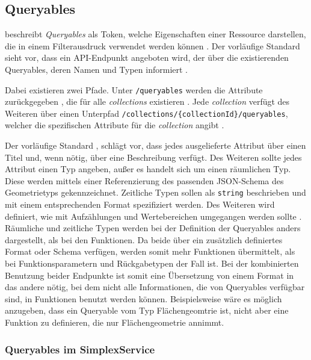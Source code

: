 \subsection{Queryables}
\label{sec:queryables}

 beschreibt \textit{Queryables} als Token, welche Eigenschaften einer Ressource darstellen, die in einem Filterausdruck verwendet werden können . Der vorläufige Standard sieht vor, dass ein \ac{API}-Endpunkt angeboten wird, der über die existierenden Queryables, deren Namen und Typen informiert .

Dabei existieren zwei Pfade. Unter \texttt{/queryables} werden die Attribute zurückgegeben , die für alle \textit{collections} existieren . Jede \textit{collection} verfügt des Weiteren über einen Unterpfad \texttt{/collections/\{collectionId\}/queryables}, welcher die spezifischen Attribute für die \textit{collection} angibt .

Der vorläufige Standard , schlägt vor, dass jedes ausgelieferte Attribut über einen Titel und, wenn nötig, über eine Beschreibung verfügt. Des Weiteren sollte jedes Attribut einen Typ angeben, außer es handelt sich um einen räumlichen Typ. Diese werden mittels einer Referenzierung des passenden \ac{JSON}-Schema des Geometrietyps gekennzeichnet. Zeitliche Typen sollen als \texttt{string} beschrieben und mit einem entsprechenden Format spezifiziert werden. Des Weiteren wird definiert, wie mit Aufzählungen und Wertebereichen umgegangen werden sollte . Räumliche und zeitliche Typen werden bei der Definition der Queryables anders dargestellt, als bei den Funktionen. Da beide über ein zusätzlich definiertes Format oder Schema verfügen, werden somit mehr Funktionen übermittelt, als bei Funktionsparametern und Rückgabetypen der Fall ist. Bei der kombinierten Benutzung beider Endpunkte ist somit eine Übersetzung von einem Format in das andere nötig, bei dem nicht alle Informationen, die von Queryables verfügbar sind, in Funktionen benutzt werden können. Beispielsweise wäre es möglich anzugeben, dass ein Queryable vom Typ Flächengeomtrie ist, nicht aber eine Funktion zu definieren, die nur Flächengeometrie annimmt.

\subsubsection{Queryables im SimplexService}

